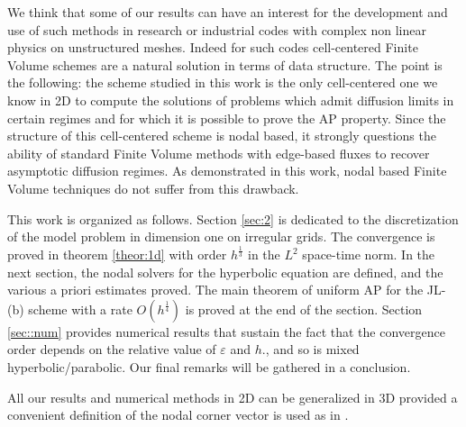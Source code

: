 \documentclass[a4paper,french,english,10pt]{article}
\newcommand\eps{\varepsilon}
\begin{document}

We think that some of our results can have an interest for the 
development and  use of such methods in research or industrial codes with complex non linear 
physics   on unstructured meshes.
Indeed for such codes  cell-centered Finite Volume schemes %
are a natural solution in terms of  data structure.
The point is the following: the scheme studied in this work
is the only cell-centered  one  we know in 2D 
to compute
the solutions of problems which admit  diffusion limits in certain regimes and for which it is possible to prove the AP property.
Since the structure of this cell-centered scheme is nodal based, it strongly questions the ability
of standard Finite Volume methods with edge-based fluxes to recover asymptotic diffusion regimes.
As demonstrated in this work, nodal based Finite Volume techniques do not suffer from this drawback.




This work is organized as follows.
Section \ref{sec:2}
is dedicated to the discretization 
of the model problem in dimension one on irregular grids.
The convergence is proved in 
theorem \ref{theor:1d}
with order
$h^{\frac13}$ in the $L^2$ space-time norm.
In the next section, the nodal solvers for the hyperbolic equation are defined, and the various a priori
estimates proved. 
The main theorem of uniform AP for the JL-(b) scheme
with a rate $O(h^\frac14)$
is proved at the end of the section.
Section \ref{sec::num}
  provides numerical results that sustain the fact
that the convergence order depends on the relative value of $\eps$ and $h$.,
and so is mixed hyperbolic/parabolic. 
Our final remarks will be gathered in a conclusion.

All our results and numerical methods in 2D can be generalized in 3D 
provided a convenient definition of the nodal corner vector is used as in \cite{de10}.
 
\end{document}
